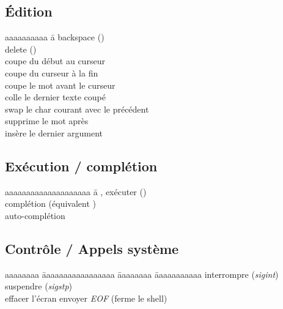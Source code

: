 \documentclass{article}
\let\oldkeys\keys
\renewcommand{\keys}[1]{\small\oldkeys{#1}\normalsize}
\begin{document}
\begin{multicols}{4}
    \subsection*{Édition}

    \begin{tabbing}
        aaaaaaaaaa \= a \kill
         \> backspace (\keys{\backspace})    \\
         \> delete (\keys{\del})             \\
         \> coupe du début au curseur              \\
         \> coupe du curseur à la fin              \\
         \> coupe le mot avant le curseur          \\
         \> colle le dernier texte coupé           \\
         \> swap le char courant avec le précédent \\
          \> supprime le mot après                  \\
          \> insère le dernier argument
    \end{tabbing}

    \subsection*{Exécution / complétion}

    \begin{tabbing}
        aaaaaaaaaaaaaaaaaaaa \= a \kill
        ,  exécuter (\keys{\return}) \\
         \> complétion (équivalent \keys{\tab})                           \\
        \keys{\tab}{}    \> auto-complétion
    \end{tabbing}

    \subsection*{Contrôle / Appels système}

    \begin{tabbing}
        aaaaaaaa \= aaaaaaaaaaaaaaaaa \= aaaaaaaa \= aaaaaaaaaaa \kill
         \> interrompre (\emph{sigint}) \>  \> suspendre (\emph{sigstp}) \\
         \> effacer l'écran \>
         \> envoyer \emph{EOF} (ferme le shell)
    \end{tabbing}


\end{multicols}
\end{document}
